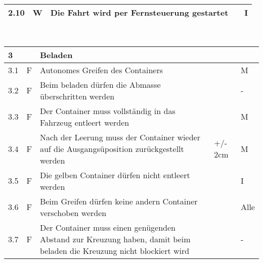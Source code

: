 \begin{center}
\begin{tabular}{|p{1cm}|p{0.5cm}|p{5cm}|p{5cm}|p{1.5cm}|}
 2.10 & W & Die Fahrt wird per Fernsteuerung gestartet & & I \\\hline
\end{tabular}\\[0.3cm]
\begin{tabular}{|p{1cm}|p{0.5cm}|p{5cm}|p{5cm}|p{1.5cm}|}\hline
 \textbf{3} & & \textbf{Beladen} & & \\\hline
 3.1 & F & Autonomes Greifen des Containers & & M\\\hline
 3.2 & F & Beim beladen dürfen die Abmasse überschritten werden & & -\\\hline
 3.3 & F & Der Container muss vollständig in das Fahrzeug entleert werden & & M\\\hline
 3.4 & F & Nach der Leerung muss der Container wieder auf die Ausgangsüposition zurückgestellt werden & +/- 2cm & M\\\hline
 3.5 & F & Die gelben Container dürfen nicht entleert werden & & I\\\hline
 3.6 & F & Beim Greifen dürfen keine andern Container verschoben werden & & Alle\\\hline
 3.7 & F & Der Container muss einen genügenden Abstand zur Kreuzung haben, damit beim beladen die Kreuzung nicht blockiert wird & & - \\\hline   
\end{tabular}
\end{center}

